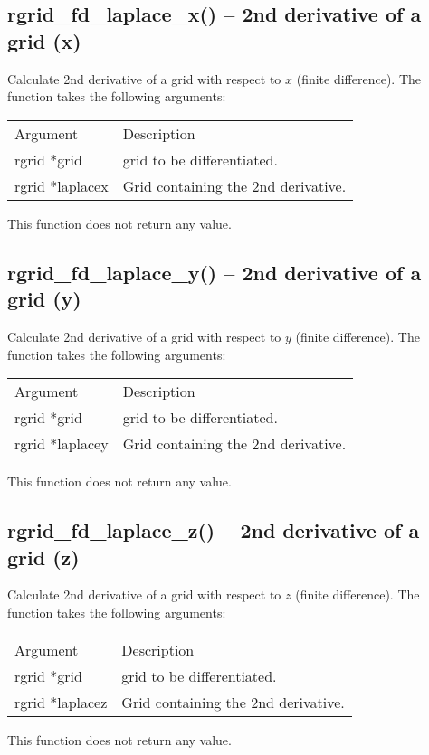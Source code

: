 \documentclass[12pt,letterpaper]{report}
\begin{document}
\subsection{rgrid\_fd\_laplace\_x() -- 2nd derivative of a grid (x)}

Calculate 2nd derivative of a grid with respect to $x$ (finite difference). The function takes the following arguments:
\begin{longtable}{p{} p{}}
Argument & Description\\
\cline{1-2}
rgrid *grid & grid to be differentiated.\\
rgrid *laplacex & Grid containing the 2nd derivative.\\
\end{longtable}
\noindent
This function does not return any value.

\subsection{rgrid\_fd\_laplace\_y() -- 2nd derivative of a grid (y)}

Calculate 2nd derivative of a grid with respect to $y$ (finite difference). The function takes the following arguments:
\begin{longtable}{p{} p{}}
Argument & Description\\
\cline{1-2}
rgrid *grid & grid to be differentiated.\\
rgrid *laplacey & Grid containing the 2nd derivative.\\
\end{longtable}
\noindent
This function does not return any value.

\subsection{rgrid\_fd\_laplace\_z() -- 2nd derivative of a grid (z)}

Calculate 2nd derivative of a grid with respect to $z$ (finite difference). The function takes the following arguments:
\begin{longtable}{p{} p{}}
Argument & Description\\
\cline{1-2}
rgrid *grid & grid to be differentiated.\\
rgrid *laplacez & Grid containing the 2nd derivative.\\
\end{longtable}
\noindent
This function does not return any value.
\end{document}
